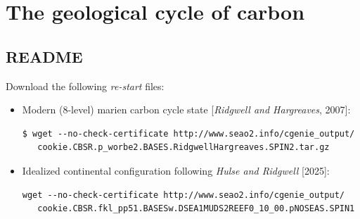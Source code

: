 
\cleardoublepage


\chapter{The geological cycle of carbon}\label{ch:geological-carbon}

\hfill \break

\vspace{24mm}

\noindent

\newpage

\section*{README}

Download the following \textit{re-start} files:

\vspace{2mm}
\begin{itemize}[noitemsep]
\vspace{1mm}
\item [] Modern (8-level) marien carbon cycle state [\textit{Ridgwell and Hargreaves}, 2007]:
\vspace{-1mm}\small\begin{verbatim}
$ wget --no-check-certificate http://www.seao2.info/cgenie_output/
   cookie.CBSR.p_worbe2.BASES.RidgwellHargreaves.SPIN2.tar.gz
\end{verbatim}\normalsize\vspace{-1mm}
\vspace{1mm}
\item [] Idealized continental configuration following \textit{Hulse and Ridgwell} [2025]:
\vspace{-1mm}\small\begin{verbatim}
wget --no-check-certificate http://www.seao2.info/cgenie_output/
   cookie.CBSR.fkl_pp51.BASESw.DSEA1MUDS2REEF0_10_00.pNOSEAS.SPIN1
\end{verbatim}\normalsize\vspace{-1mm}
\end{itemize}


